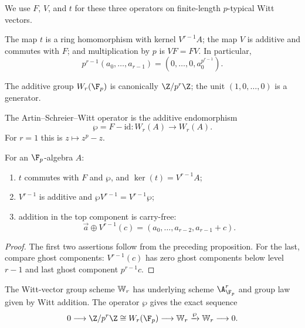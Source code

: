 \begin{definition}\label{definition:witt_operators}
We use $F$, $V$, and $t$ for these three operators on finite-length
$p$-typical Witt vectors.
\end{definition}

\begin{prop}\label{prop:witt_multiplication_by_p}
The map $t$ is a ring homomorphism with kernel $V^{r-1}A$; the map $V$ is
additive and commutes with $F$; and multiplication by $p$ is $VF=FV$. In
particular,
\begin{equation}\label{eq:witt_p_to_r_minus_1}
 p^{r-1}(a_0,\dots,a_{r-1})=(0,\dots,0,a_0^{p^{r-1}}).
\end{equation}
\end{prop}

\begin{example}\label{example:witt_of_Fp}
The additive group $W_r(\F_p)$ is canonically $\Z/p^r\Z$; the unit
$(1,0,\dots,0)$ is a generator.
\end{example}

\begin{definition}\label{definition:asw_operator}
The Artin--Schreier--Witt operator is the additive endomorphism
\[
    \wp=F-\mathrm{id}:W_r(A)\longrightarrow W_r(A).
\]
For $r=1$ this is $z\mapsto z^p-z$.
\end{definition}

\begin{lemma}\label{lemma:witt_bookkeeping}
For an $\F_p$-algebra $A$:
\begin{enumerate}[label=(\roman*)]
 \item $t$ commutes with $F$ and $\wp$, and $\ker(t)=V^{r-1}A$;
 \item $V^{r-1}$ is additive and $\wp V^{r-1}=V^{r-1}\wp$;
 \item addition in the top component is carry-free:
 \[
   \vec a\oplus V^{r-1}(c)=(a_0,\dots,a_{r-2},a_{r-1}+c).
 \]
\end{enumerate}
\end{lemma}
\begin{proof}
The first two assertions follow from the preceding proposition. For the last,
compare ghost components: $V^{r-1}(c)$ has zero ghost components below level
$r-1$ and last ghost component $p^{r-1}c$.
\end{proof}

The Witt-vector group scheme $\mathbb{W}_r$ has underlying scheme $\A^r_{\F_p}$ and
group law given by Witt addition. The operator $\wp$ gives the exact sequence
\begin{equation}\label{eq:asw_lang_sequence}
0\longrightarrow\Z/p^r\Z\cong W_r(\F_p)
 \longrightarrow\bW_r\xrightarrow{\wp}\bW_r\longrightarrow0.
\end{equation}

